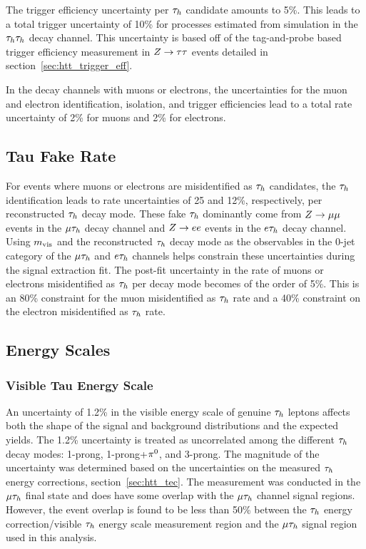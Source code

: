 The trigger efficiency uncertainty per $\tau_{h}$ candidate amounts to 5\%. This leads to a total 
trigger uncertainty of 10\% for processes estimated from simulation in the $\tau_{h}\tau_{h}$ decay channel. 
This uncertainty is based off of the tag-and-probe based trigger efficiency measurement in 
$Z\to\tau\tau$ events detailed in section~\ref{sec:htt_trigger_eff}.

In the decay channels with muons or electrons, the uncertainties for the muon and electron identification, 
isolation, and trigger efficiencies lead to a total rate uncertainty of 2\% for muons and 2\% for electrons.


\subsection{Tau Fake Rate}
For events where muons or electrons are misidentified as $\tau_{h}$ candidates, the $\tau_{h}$ identification leads 
to rate uncertainties of 25 and 12\%, respectively, per reconstructed $\tau_{h}$ decay mode. These fake $\tau_{h}$
dominantly come from $Z\to\mu\mu$ events in the $\mu\tau_{h}$ decay channel and $Z\to ee$ events 
in the $e\tau_{h}$ decay channel. Using $m_\text{vis}$ and the reconstructed 
$\tau_{h}$ decay mode as the observables in the 0-jet category of the $\mu\tau_{h}$ and $e\tau_{h}$ channels helps constrain these 
uncertainties during the signal extraction fit. The post-fit uncertainty in the rate of muons or electrons 
misidentified as $\tau_{h}$ per decay mode becomes of the order of 5\%. This is an 80\% constraint for the muon
misidentified as $\tau_{h}$ rate and a 40\% constraint on the electron misidentified as $\tau_{h}$ rate.


\subsection{Energy Scales}
\subsubsection{Visible Tau Energy Scale}
An uncertainty of 1.2\% in the visible energy scale of genuine $\tau_{h}$ leptons affects both the shape of the
signal and background distributions and the expected yields. The 1.2\% uncertainty is treated as uncorrelated 
among the different $\tau_{h}$ decay modes: 1-prong, 1-prong+$\pi^{0}$, and 3-prong.
The magnitude of the uncertainty was determined based on the uncertainties on the measured $\tau_{h}$ energy 
corrections, section~\ref{sec:htt_tec}. The measurement was conducted in the $\mu\tau_{h}$ final state and
does have some overlap with the $\mu\tau_{h}$ channel signal regions. However, the event overlap is found to be
less than 50\% between the $\tau_{h}$ energy correction/visible $\tau_{h}$ energy scale measurement region and the
$\mu\tau_{h}$ signal region used in this analysis.

